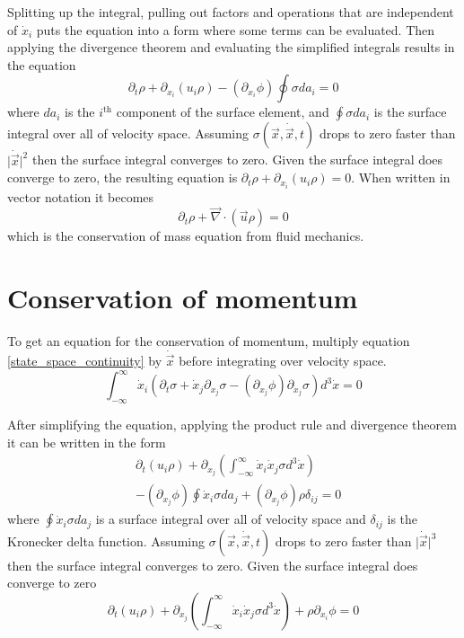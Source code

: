 \documentclass[%
 reprint,
 amsmath,amssymb,
 aps,
]{revtex4-1}
\newcommand{\dvec}[1]{\dot{\vec{#1}}}
\newcommand{\grad}{\vec{\nabla}}
\newcommand{\intVdot}[1]{\int_{-\infty}^{\infty} #1 d^3\dot{x}}
\begin{document}
Splitting up the integral, pulling out factors and operations that are independent of $\dot{x}_i$ puts the equation into a form where some terms can be evaluated. Then applying the divergence theorem and evaluating the simplified integrals results in the equation
\[
\partial_t\rho + \partial_{x_i}\left(u_i\rho\right)-\left(\partial_{x_i}\phi\right)\oint{\sigma da_i}=0
\]
where $da_i$ is the $i^{\text{th}}$ component of the surface element, and $\oint{\sigma da_i}$ is the surface integral over all of velocity space. Assuming $\sigma(\vec{x}, \dvec{x}, t)$ drops to zero faster than $\lvert\dvec{x}\rvert^2$ then the surface integral converges to zero. Given the surface integral does converge to zero, the resulting equation is $\partial_t\rho + \partial_{x_i}\left(u_i\rho\right)=0$. When written in vector notation it becomes
\begin{equation}
\partial_t\rho + \grad\cdot\left(\vec{u}\rho\right)=0
\label{conservation_of_mass}
\end{equation}
which is the conservation of mass equation from fluid mechanics.

\section{Conservation of momentum}
To get an equation for the conservation of momentum, multiply equation \eqref{state_space_continuity} by $\dvec{x}$ before integrating over velocity space.
\[
\intVdot{\dot{x}_i\left(\partial_t \sigma + \dot{x}_j\partial_{x_j}\sigma-\left(\partial_{x_j}\phi\right)\partial_{\dot{x}_j}\sigma\right)}=0
\]

After simplifying the equation, applying the product rule and divergence theorem it can be written in the form
\[
\begin{split}
& \partial_t\left(u_i\rho\right) + \partial_{x_j}\left(\intVdot{\dot{x}_i\dot{x}_j\sigma}\right) \\ & - \left(\partial_{x_j}\phi\right)\oint\dot{x}_i\sigma da_j + \left(\partial_{x_j}\phi\right)\rho\delta_{i j}=0
\end{split}
\]
where $\oint\dot{x}_i\sigma da_j$ is a surface integral over all of velocity space and $\delta_{ij}$ is the Kronecker delta function. Assuming $\sigma(\vec{x}, \dvec{x}, t)$ drops to zero faster than $\lvert\dvec{x}\rvert^3$ then the surface integral converges to zero. Given the surface integral does converge to zero
\begin{equation}
\partial_t\left(u_i\rho\right) + \partial_{x_j}\left(\intVdot{\dot{x}_i\dot{x}_j\sigma}\right) + \rho\partial_{x_i}\phi=0
\label{incomplete_conservation_of_momentum}
\end{equation}
\end{document}
